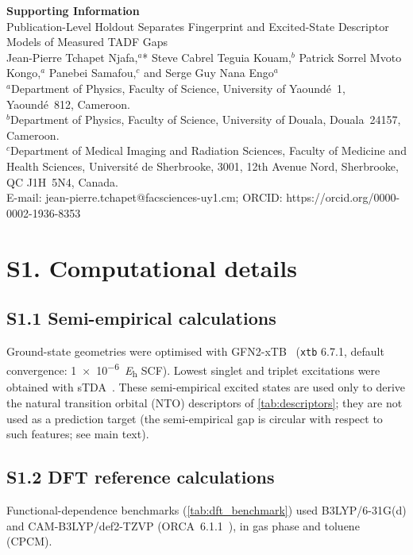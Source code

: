 \documentclass[final,3p,times,twocolumn]{elsarticle}
\begin{document}
\begin{center}
  {\large\textbf{Supporting Information}}\\[4pt]
  {\large Publication-Level Holdout Separates Fingerprint and Excited-State Descriptor Models of Measured TADF Gaps}\\[6pt]
  Jean-Pierre Tchapet Njafa,$^{a}$* Steve Cabrel Teguia Kouam,$^{b}$ Patrick Sorrel Mvoto Kongo,$^{a}$ Panebei Samafou,$^{c}$ and Serge Guy Nana Engo$^{a}$\\[4pt]
  {\small $^a$Department of Physics, Faculty of Science, University of Yaound\'{e}~1, Yaound\'{e}~812, Cameroon.}\\
  {\small $^b$Department of Physics, Faculty of Science, University of Douala, Douala~24157, Cameroon.}\\
  {\small $^c$Department of Medical Imaging and Radiation Sciences, Faculty of Medicine and Health Sciences, Universit\'{e} de Sherbrooke, 3001, 12th Avenue Nord, Sherbrooke, QC J1H~5N4, Canada.}\\[4pt]
  {\small *E-mail: jean-pierre.tchapet@facsciences-uy1.cm; ORCID: https://orcid.org/0000-0002-1936-8353}
\end{center}
\vspace{8pt}

\section*{S1. Computational details}

\subsection*{S1.1 Semi-empirical calculations}
Ground-state geometries were optimised with GFN2-xTB~\cite{Bannwarth2019}
(\texttt{xtb} 6.7.1, default convergence: \qty{1e-6}{\hartree} SCF). Lowest singlet and
triplet excitations were obtained with sTDA~\cite{Grimme2017}. These
semi-empirical excited states are used only to derive the natural transition
orbital (NTO) descriptors of \cref{tab:descriptors}; they are not used as a
prediction target (the semi-empirical gap is circular with respect to such
features; see main text).

\subsection*{S1.2 DFT reference calculations}
Functional-dependence benchmarks (\cref{tab:dft_benchmark}) used
B3LYP/6-31G(d) and CAM-B3LYP/def2-TZVP
(ORCA~6.1.1~\cite{Neese2020}), in gas phase and toluene (CPCM).
\end{document}
